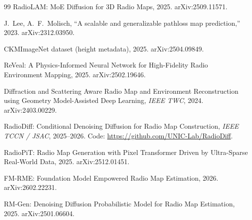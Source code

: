 \documentclass[11pt,a4paper]{article}
\begin{document}
\begin{thebibliography}{99}
RadioLAM: MoE Diffusion for 3D Radio Maps,
2025.
arXiv:2509.11571.

J.~Lee, A.~F.~Molisch,
``A scalable and generalizable pathloss map prediction,''
2023.
arXiv:2312.03950.

CKMImageNet dataset (height metadata),
2025.
arXiv:2504.09849.

ReVeal: A Physics-Informed Neural Network for High-Fidelity Radio Environment Mapping,
2025.
arXiv:2502.19646.

Diffraction and Scattering Aware Radio Map and Environment Reconstruction
using Geometry Model-Assisted Deep Learning,
\textit{IEEE TWC}, 2024.
arXiv:2403.00229.

RadioDiff: Conditional Denoising Diffusion for Radio Map Construction,
\textit{IEEE TCCN / JSAC}, 2025--2026.
Code: \url{https://github.com/UNIC-Lab/RadioDiff}.

RadioPiT: Radio Map Generation with Pixel Transformer Driven by Ultra-Sparse
Real-World Data,
2025.
arXiv:2512.01451.

FM-RME: Foundation Model Empowered Radio Map Estimation,
2026.
arXiv:2602.22231.

RM-Gen: Denoising Diffusion Probabilistic Model for Radio Map Estimation,
2025.
arXiv:2501.06604.

\end{thebibliography}
\end{document}
